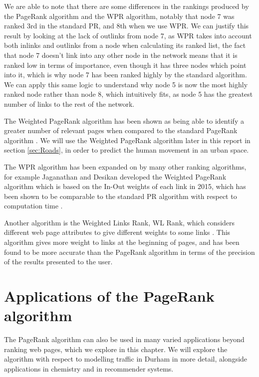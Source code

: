 \documentclass[11pt]{report}
\begin{document}
We are able to note that there are some differences in the rankings produced by the PageRank algorithm and the WPR algorithm, notably that node 7 was ranked 3rd in the standard PR, and 8th when we use WPR. We can justify this result by looking at the lack of outlinks from node 7, as WPR takes into account both inlinks and outlinks from a node when calculating its ranked list, the fact that node 7 doesn't link into any other node in the network means that it is ranked low in terms of importance, even though it has three nodes which point into it, which is why node 7 has been ranked highly by the standard algorithm. We can apply this same logic to understand why node 5 is now the most highly ranked node rather than node 8, which intuitively fits, as node 5 has the greatest number of links to the rest of the network. 

The Weighted PageRank algorithm has been shown as being able to identify a greater number of relevant pages when compared to the standard PageRank algorithm \cite{xing2004weighted}. We will use the Weighted PageRank algorithm later in this report in section \ref{sec:Roads}, in order to predict the human movement in an urban space.

The WPR algorithm has been expanded on by many other ranking algorithms, for example Jaganathan and Desikan developed the Weighted PageRank algorithm which is based on the In-Out weights of each link in 2015, which has been shown to be comparable to the standard PR algorithm with respect to computation time \cite{jaganathan2015weighted}. 

Another algorithm is the Weighted Links Rank, WL Rank, which considers different web page attributes to give different weights to some links \cite{baeza2004web}. This algorithm gives more weight to links at the beginning of pages, and has been found to be more accurate than the PageRank algorithm in terms of the precision of the results presented to the user.

\chapter{Applications of the PageRank algorithm} \label{chap:Applications}
The PageRank algorithm can also be used in many varied applications beyond ranking web pages, which we explore in this chapter. We will explore the algorithm with respect to modelling traffic in Durham in more detail, alongside applications in chemistry and in recommender systems. 
\end{document}
